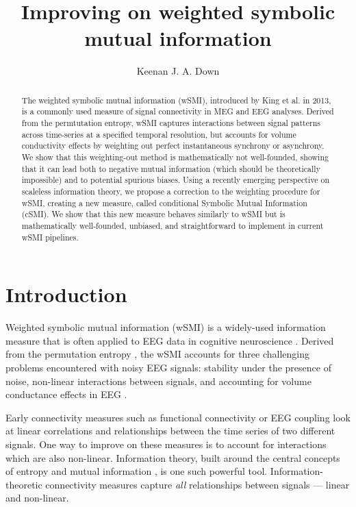 \documentclass[twocolumns]{IEEEtran}%
\title{Improving on weighted symbolic mutual information}
\author[1]{Keenan J. A. Down}
\affil[1]{\textit{Independent researcher, Cambridge, United Kingdom}}
\theoremstyle{definition}
\begin{document}
\maketitle

\begin{abstract}
The weighted symbolic mutual information (wSMI), introduced by King et al. in 2013, is a commonly used measure of signal connectivity in MEG and EEG analyses. Derived from the permtutation entropy, wSMI captures interactions between signal patterns across time-series at a specified temporal resolution, but accounts for volume conductivity effects by weighting out perfect instantaneous synchrony or asynchrony. We show that this weighting-out method is mathematically not well-founded, showing that it can lead both to negative mutual information (which should be theoretically impossible) and to potential spurious biases. Using a recently emerging perspective on scaleless information theory, we propose a correction to the weighting procedure for wSMI, creating a new measure, called conditional Symbolic Mutual Information (cSMI). We show that this new measure behaves similarly to wSMI but is mathematically well-founded, unbiased, and straightforward to implement in current wSMI pipelines.
\end{abstract}

\section{Introduction}
Weighted symbolic mutual information (wSMI) is a widely-used information measure that is often applied to EEG data in cognitive neuroscience \cite{king2013information, sitt2014large, imperatori2019eeg, gaubert2019eeg, imperatori2021cross, ding2023resting, van2024local, baki2024decision}. Derived from the permutation entropy \cite{bandt2002permutation}, the wSMI accounts for three challenging problems encountered with noisy EEG signals: stability under the presence of noise, non-linear interactions between signals, and accounting for volume conductance effects in EEG \cite{nobody}.

Early connectivity measures such as functional connectivity \cite{friston1993functional, friston1994functional, biswal1995functional} or EEG coupling \cite{nobody} look at linear correlations and relationships between the time series of two different signals. One way to improve on these measures is to account for interactions which are also non-linear. Information theory, built around the central concepts of entropy and mutual information \cite{shannon1948mathematical}, is one such powerful tool. Information-theoretic connectivity measures capture \textit{all} relationships between signals --- linear and non-linear.
\end{document}
